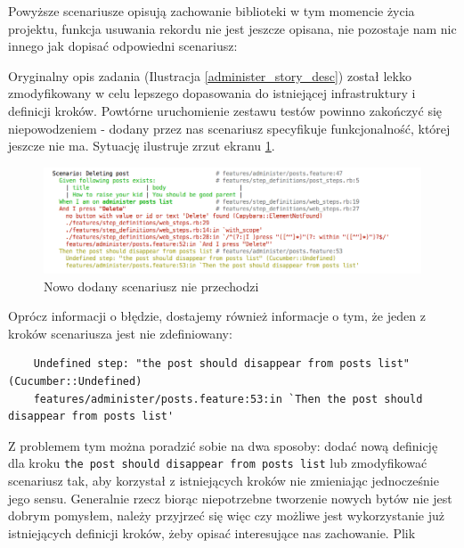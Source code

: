   	
  	
  	Powyższe scenariusze opisują zachowanie biblioteki w tym momencie życia projektu, funkcja usuwania rekordu nie jest jeszcze opisana, nie pozostaje nam nic innego jak dopisać odpowiedni scenariusz:
  	
  	
  	
  	Oryginalny opis zadania (Ilustracja \ref{administer_story_desc}) został lekko zmodyfikowany w celu lepszego dopasowania do istniejącej infrastruktury i definicji kroków. Powtórne uruchomienie zestawu testów powinno zakończyć się niepowodzeniem - dodany przez nas scenariusz specyfikuje funkcjonalność, której jeszcze nie ma. Sytuację ilustruje zrzut ekranu \ref{scenario_failure}.
  	
  	\clearpage
  	
  	\begin{figure}[!h]
  		\begin{center}
  			\includegraphics[width=\linewidth]{images/scenario_failure.png}
  			\caption{Nowo dodany scenariusz nie przechodzi}
  			\label{scenario_failure}
  		\end{center}
  	\end{figure}
  	
  	Oprócz informacji o błędzie, dostajemy również informacje o tym, że jeden z kroków scenariusza jest nie zdefiniowany:
  	
  	\begin{lstlisting}
    Undefined step: "the post should disappear from posts list" (Cucumber::Undefined)
    features/administer/posts.feature:53:in `Then the post should disappear from posts list'
    \end{lstlisting}
    
    Z problemem tym można poradzić sobie na dwa sposoby: dodać nową definicję dla kroku \verb+the post should disappear from posts list+ lub zmodyfikować scenariusz tak, aby korzystał z istniejących kroków nie zmieniając jednocześnie jego sensu. Generalnie rzecz biorąc niepotrzebne tworzenie nowych bytów nie jest dobrym pomysłem, należy przyjrzeć się więc czy możliwe jest wykorzystanie już istniejących definicji kroków, żeby opisać interesujące nas zachowanie. Plik
    
